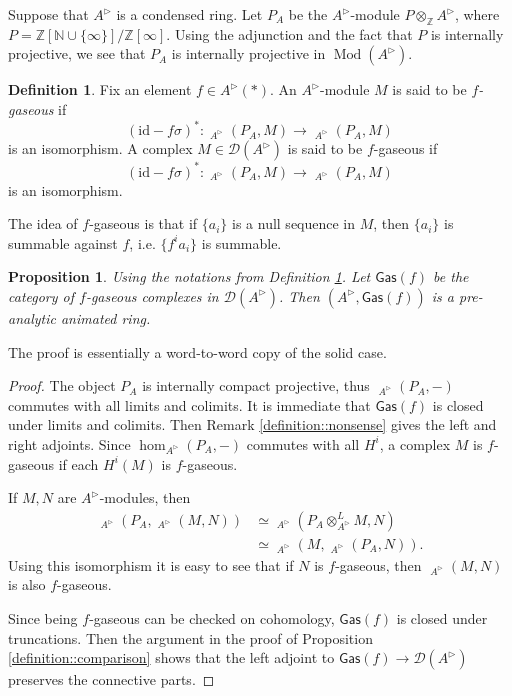 \documentclass{article}
\theoremstyle{plain}
\newtheorem{prop}[thm]{Proposition}
\theoremstyle{definition}
\newtheorem{defi}[thm]{Definition}
\theoremstyle{remark}
\DeclareMathOperator{\Homs}{\underline{Hom}}
\DeclareMathOperator{\rhoms}{\underline{RHom}}
\DeclareMathOperator{\modcat}{Mod}
\newcommand{\dten}{\otimes ^{L}}
\newcommand{\huflag}{\triangleright}
\newcommand{\D}{\mathcal{D}}
\begin{document}
Suppose that $ A ^{\huflag} $ is a condensed ring.
Let $ P _{A} $ be the $ A ^{\huflag} $-module $ P \otimes _{\mathbb{Z}} A ^{\huflag} $,
where $ P = \mathbb{Z}[\mathbb{N}\cup \{\infty\}] / \mathbb{Z}[\infty] $.
Using the adjunction and the fact that $ P $ is internally projective,
we see that $ P _{A} $ is internally projective in $ \modcat (A ^{\huflag}) $.

\begin{defi}
Fix an element $ f\in A ^{\huflag} (*) $. An $ A ^{\huflag} $-module $ M $ is said to be \emph{$ f $-gaseous} if
\begin{equation*}
(\mathrm{id} - f \sigma)^{*}: \Homs _{A ^{\huflag}}(P _{A}, M) \to \Homs _{A ^{\huflag}}(P _{A}, M)
\end{equation*}
is an isomorphism.
A complex $ M\in \D (A ^{\huflag}) $ is said to be $ f $-gaseous if
\begin{equation}
(\mathrm{id}-f \sigma)^{*}: \rhoms _{A ^{\huflag}}(P _{A}, M)\to \rhoms _{A ^{\huflag}}(P _{A}, M)
\end{equation}
is an isomorphism.
\label{gaseous::def}
\end{defi}

The idea of $ f $-gaseous is that
if $ \{a _{i}\} $ is a null sequence in $ M $, then
$ \{a _{i}\} $ is summable against $ f $, i.e. $ \{ f ^{i} a _{i}\} $ is summable.


\begin{prop}
Using the notations from Definition \ref{gaseous::def}.
Let $ \mathsf{Gas}(f) $ be the category of $ f $-gaseous complexes in $ \D (A ^{\huflag}) $.
Then $ (A ^{\huflag}, \mathsf{Gas}(f)) $ is a pre-analytic animated ring.
\end{prop}

The proof is essentially a word-to-word copy of the solid case.

\begin{proof}
The object $ P _{A} $ is internally compact projective, thus $ \rhoms _{A ^{\huflag}}(P _{A}, -) $ commutes with all limits and colimits.
It is immediate that $ \mathsf{Gas}(f) $ is closed under limits and colimits.
Then Remark \ref{definition::nonsense} gives the left and right adjoints.
Since $ \hom _{A ^{\huflag}}(P _{A}, -) $ commutes with all $ H ^{i} $, a complex $ M $ is $ f $-gaseous if each $ H ^{i}(M) $ is $ f $-gaseous.

If $ M,N $ are $ A ^{\huflag} $-modules, then
\begin{align*}
\rhoms _{A ^{\huflag}}(P _{A}, \rhoms _{A ^{\huflag}}(M, N))
&\simeq \rhoms _{A ^{\huflag}}(P _{A}\dten _{A ^{\huflag}} M, N)\\
&\simeq \rhoms _{A ^{\huflag}}(M, \rhoms _{A ^{\huflag}}(P _{A}, N)).
\end{align*}
Using this isomorphism it is easy to see that if $ N $ is $ f $-gaseous,
then $ \rhoms _{A ^{\huflag}}(M, N) $ is also $ f $-gaseous.

Since being $ f $-gaseous can be checked on cohomology, $ \mathsf{Gas}(f) $ is closed under truncations.
Then the argument in the proof of Proposition \ref{definition::comparison} shows that
the left adjoint to $ \mathsf{Gas}(f)\to \D (A ^{\huflag}) $ preserves the connective parts.
\end{proof}
\end{document}
